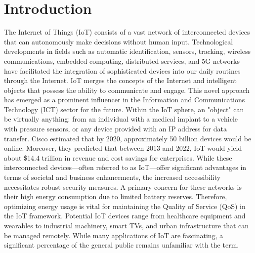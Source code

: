 

\section{Introduction}
\label{sec:introduction}
%
%


The Internet of Things (IoT) consists of a vast network of interconnected devices that can autonomously make decisions without human input. Technological developments in fields such as automatic identification, sensors, tracking, wireless communications, embedded computing, distributed services, and 5G networks have facilitated the integration of sophisticated devices into our daily routines through the Internet. IoT merges the concepts of the Internet and intelligent objects that possess the ability to communicate and engage. This novel approach has emerged as a prominent influencer in the Information and Communications Technology (ICT) sector for the future. Within the IoT sphere, an "object" can be virtually anything: from an individual with a medical implant to a vehicle with pressure sensors, or any device provided with an IP address for data transfer. Cisco estimated that by 2020, approximately 50 billion devices would be online. Moreover, they predicted that between 2013 and 2022, IoT would yield about \$14.4 trillion in revenue and cost savings for enterprises. While these interconnected devices—often referred to as IoT—offer significant advantages in terms of societal and business enhancements, the increased accessibility necessitates robust security measures. A primary concern for these networks is their high energy consumption due to limited battery reserves. Therefore, optimizing energy usage is vital for maintaining the Quality of Service (QoS) in the IoT framework. Potential IoT devices range from healthcare equipment and wearables to industrial machinery, smart TVs, and urban infrastructure that can be managed remotely. While many applications of IoT are fascinating, a significant percentage of the general public remains unfamiliar with the term.

